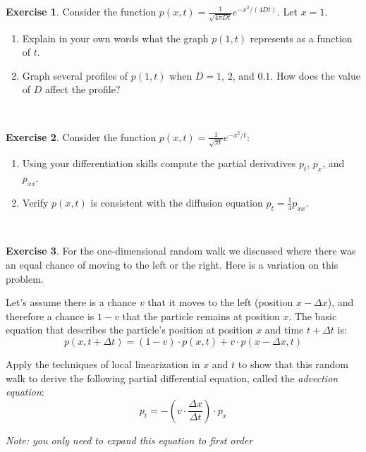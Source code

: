 \documentclass[
]{book}
\theoremstyle{definition}
\theoremstyle{definition}
\theoremstyle{definition}
\newtheorem{exercise}{Exercise}[chapter]
\theoremstyle{remark}
\begin{document}
\begin{exercise}
\protect\hypertarget{exr:unnamed-chunk-337}{}{\label{exr:unnamed-chunk-337} }Consider the function \(\displaystyle p(x,t) = \frac{1}{\sqrt{4 \pi D t}} e^{-x^{2}/(4 D t)}\). Let \(x=1\).

\begin{enumerate}[label=\alph*.]
\item Explain in your own words what the graph $p(1,t)$ represents as a function of $t$.
\item Graph several profiles of $p(1,t)$ when $D = 1$, $2$, and $0.1$. How does the value of $D$ affect the profile?
\end{enumerate}
\end{exercise}

~

\begin{exercise}
\protect\hypertarget{exr:unnamed-chunk-338}{}{\label{exr:unnamed-chunk-338} }Consider the function \(\displaystyle p(x,t) = \frac{1}{\sqrt{\pi t}} e^{-x^{2}/t}\):

\begin{enumerate}[label=\alph*.]
\item Using your differentiation skills compute the partial derivatives $p_{t}$, $p_{x}$, and $p_{xx}$.
\item Verify $p(x,t)$ is consistent with the diffusion equation $\displaystyle p_{t}=\frac{1}{4} p_{xx}$.
\end{enumerate}
\end{exercise}

~

\begin{exercise}
\protect\hypertarget{exr:unnamed-chunk-339}{}{\label{exr:unnamed-chunk-339} }For the one-dimensional random walk we discussed where there was an equal chance of moving to the left or the right. Here is a variation on this problem.

Let's assume there is a chance \(v\) that it moves to the left (position \(x - \Delta x\)), and therefore a chance is \(1-v\) that the particle remains at position \(x\). The basic equation that describes the particle's position at position \(x\) and time \(t + \Delta t\) is:
\begin{equation}
p(x,t + \Delta t) = (1-v) \cdot p(x,t) + v \cdot p(x- \Delta x,t)
\end{equation}

Apply the techniques of local linearization in \(x\) and \(t\) to show that this random walk to derive the following partial differential equation, called the \emph{advection equation}:
\begin{equation}
p_{t} = - \left( v \cdot \frac{ \Delta x}{\Delta t} \right) \cdot p_{x}
\end{equation}

\emph{Note: you only need to expand this equation to first order}
\end{exercise}
\end{document}
